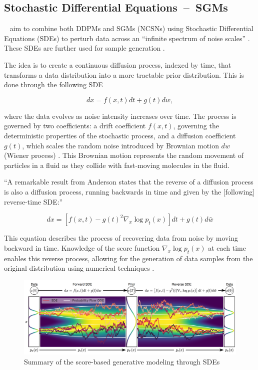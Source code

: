 \subsection{Stochastic Differential Equations~--~SGMs}

~\cite{song2020score} aim to combine both DDPMs and SGMs (NCSNs) using Stochastic Differential Equations (SDEs) to perturb data across an ``infinite spectrum of noise scales'' \citep{song2020score}. These SDEs are further used for sample generation \citep{yangdiffusionSummary}.

The idea is to create a continuous diffusion process, indexed by time, that transforms a data distribution into a more tractable prior distribution. This is done through the following SDE

\[ dx = f(x, t)dt + g(t)dw, \]

\citep{yangdiffusionSummary} where the data evolves as noise intensity increases over time. The process is governed by two coefficients: a drift coefficient \( f(x, t) \), governing the deterministic properties of the stochastic process, and a diffusion coefficient \( g(t) \), which scales the random noise introduced by Brownian motion \( dw \) (Wiener process) \citep{song2020score}. This Brownian motion represents the random movement of particles in a fluid as they collide with fast-moving molecules in the fluid. 

``A remarkable result from Anderson \citep{anderson1982313} states that the reverse of a diffusion process is also a diffusion process, running backwards in time and given by the [following] reverse-time SDE:\@'' \citep{song2020score}

\[ dx = \left[ f(x, t) - g(t)^2 \nabla_x \log p_t(x) \right] dt + g(t)d\bar{w} \]

This equation describes the process of recovering data from noise by moving backward in time. Knowledge of the score function \( \nabla_x \log p_t(x) \) at each time enables this reverse process, allowing for the generation of data samples from the original distribution using numerical techniques \citep{song2020score}.

\begin{figure}[ht]
  \centering
    \includegraphics[width=1\columnwidth]{figures/DiffusionModels_SDEs.png}
    \caption{Summary of the score-based generative modeling through SDEs \citep{song2020score}}\label{fig:DM_SDEs}
\end{figure}


